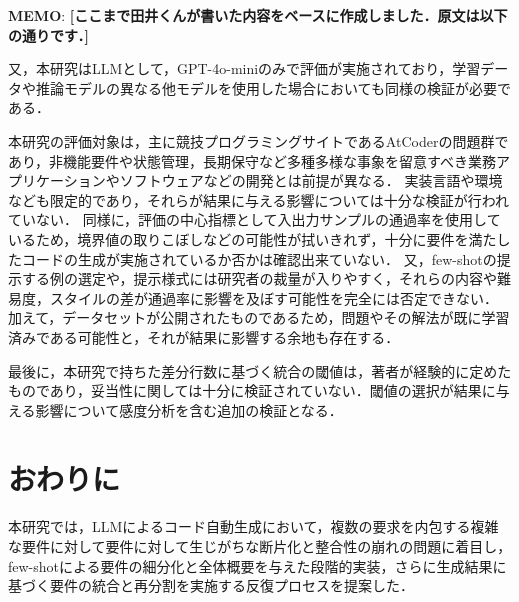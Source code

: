 \documentclass[submit,techrep,noauthor]{ipsj}
\newcommand{\memo}[1]{\colorbox{magenta!30}{{\bf MEMO}:}{\color{red!50} {\textbf{[#1]}}}}
\begin{document}
\memo{ここまで田井くんが書いた内容をベースに作成しました．原文は以下の通りです．}

又，本研究はLLMとして，GPT-4o-miniのみで評価が実施されており，学習データや推論モデルの異なる他モデルを使用した場合においても同様の検証が必要である．

本研究の評価対象は，主に競技プログラミングサイトであるAtCoderの問題群であり，非機能要件や状態管理，長期保守など多種多様な事象を留意すべき業務アプリケーションやソフトウェアなどの開発とは前提が異なる．
実装言語や環境なども限定的であり，それらが結果に与える影響については十分な検証が行われていない．
同様に，評価の中心指標として入出力サンプルの通過率を使用しているため，境界値の取りこぼしなどの可能性が拭いきれず，十分に要件を満たしたコードの生成が実施されているか否かは確認出来ていない．
又，few-shotの提示する例の選定や，提示様式には研究者の裁量が入りやすく，それらの内容や難易度，スタイルの差が通過率に影響を及ぼす可能性を完全には否定できない．
加えて，データセットが公開されたものであるため，問題やその解法が既に学習済みである可能性と，それが結果に影響する余地も存在する．

最後に，本研究で持ちた差分行数に基づく統合の閾値は，著者が経験的に定めたものであり，妥当性に関しては十分に検証されていない．閾値の選択が結果に与える影響について感度分析を含む追加の検証となる．

\section{おわりに}
\label{sec:conclusion}
本研究では，LLMによるコード自動生成において，複数の要求を内包する複雑な要件に対して要件に対して生じがちな断片化と整合性の崩れの問題に着目し，few-shotによる要件の細分化と全体概要を与えた段階的実装，さらに生成結果に基づく要件の統合と再分割を実施する反復プロセスを提案した．
\end{document}
